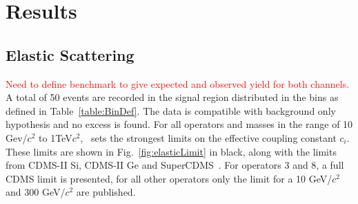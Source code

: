 \section{Results}
\subsection{Elastic Scattering}
\textcolor{red}{Need to define benchmark to give expected and observed yield for both channels.}
A total of 50 events are recorded in the signal region distributed in the bins as defined in Table~\ref{table:BinDef}. The data is compatible with background only hypothesis and no excess is found. For all operators and masses in the range of 10 Gev/$c^2$ to 1TeV$c^2$, \Xehund\ sets the strongest limits on the effective coupling constant $c_i$. These limits are shown in Fig.~\ref{fig:elasticLimit} in black, along with the limits from CDMS-II Si, CDMS-II Ge and SuperCDMS~\cite{CDMSEFT}. For operators 3 and 8, a full CDMS limit is presented, for all other operators only the limit for a 10 GeV/$c^2$ and 300 GeV/$c^2$ are published.  


